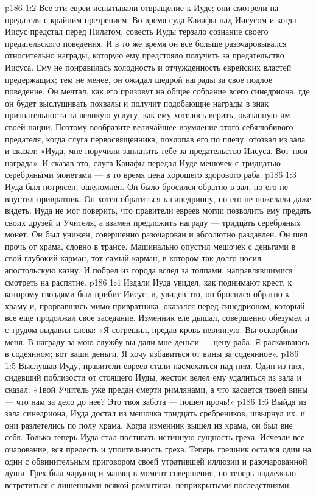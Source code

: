 \vs p186 1:2 Все эти евреи испытывали отвращение к Иуде; они смотрели на предателя с крайним презрением. Во время суда Каиафы над Иисусом и когда Иисус предстал перед Пилатом, совесть Иуды терзало сознание своего предательского поведения. И в то же время он все больше разочаровывался относительно награды, которую ему предстояло получить за предательство Иисуса. Ему не понравилась холодность и отчужденность еврейских властей предержащих; тем не менее, он ожидал щедрой награды за свое подлое поведение. Он мечтал, как его призовут на общее собрание всего синедриона, где он будет выслушивать похвалы и получит подобающие награды в знак признательности за великую услугу, как ему хотелось верить, оказанную им своей нации. Поэтому вообразите величайшее изумление этого себялюбивого предателя, когда слуга первосвященника, похлопав его по плечу, отозвал из зала и сказал: «Иуда, мне поручили заплатить тебе за предательство Иисуса. Вот твоя награда». И сказав это, слуга Каиафы передал Иуде мешочек с тридцатью серебряными монетами --- в то время цена хорошего здорового раба.
\vs p186 1:3 Иуда был потрясен, ошеломлен. Он было бросился обратно в зал, но его не впустил привратник. Он хотел обратиться к синедриону, но его не пожелали даже видеть. Иуда не мог поверить, что правители евреев могли позволить ему предать своих друзей и Учителя, а взамен предложить награду --- тридцать серебряных монет. Он был унижен, совершенно разочарован и абсолютно раздавлен. Он шел прочь от храма, словно в трансе. Машинально опустил мешочек с деньгами в свой глубокий карман, тот самый карман, в котором так долго носил апостольскую казну. И побрел из города вслед за толпами, направлявшимися смотреть на распятие.
\vs p186 1:4 Издали Иуда увидел, как поднимают крест, к которому гвоздями был прибит Иисус, и, увидев это, он бросился обратно к храму и, прорвавшись мимо привратника, оказался перед синедрионом, который все еще продолжал свое заседание. Изменник еле дышал, совершенно обезумел и с трудом выдавил слова: «Я согрешил, предав кровь невинную. Вы оскорбили меня. В награду за мою службу вы дали мне деньги --- цену раба. Я раскаиваюсь в содеянном; вот ваши деньги. Я хочу избавиться от вины за содеянное».
\vs p186 1:5 Выслушав Иуду, правители евреев стали насмехаться над ним. Один из них, сидевший поблизости от стоящего Иуды, жестом велел ему удалиться из зала и сказал: «Твой Учитель уже предан смерти римлянами, а что касается твоей вины --- что нам за дело до нее? Это твоя забота --- пошел прочь!»
\vs p186 1:6 Выйдя из зала синедриона, Иуда достал из мешочка тридцать сребреников, швырнул их, и они разлетелись по полу храма. Когда изменник вышел из храма, он был вне себя. Только теперь Иуда стал постигать истинную сущность греха. Исчезли все очарование, вся прелесть и упоительность греха. Теперь грешник остался один на один с обвинительным приговором своей утратившей иллюзии и разочарованной души. Грех был чарующ и манящ в момент совершения, но теперь надлежало встретиться с лишенными всякой романтики, неприкрытыми последствиями.
